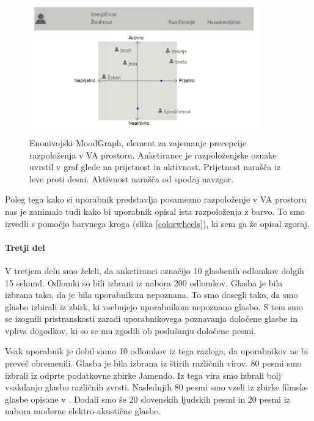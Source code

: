 \documentclass[a4paper, 12pt]{book}
\begin{document}
{\begin{figure}[ht]
\centering
\includegraphics[width=10cm]{images/enomoodgraph.png}

\caption{Enonivojski MoodGraph, element za zajemanje precepcije razpoloženja v VA prostoru. Anketiranec je razpoloženjske oznake uvrstil v graf glede na prijetnost in aktivnost. Prijetnost narašča iz leve proti desni. Aktivnost narašča od spodaj navzgor. }
\label{moodgraph}
\end{figure}

Poleg tega kako si uporabnik predstavlja posamezno razpoloženje v VA prostoru nas je zanimalo tudi kako bi uporabnik opisal ista razpoloženja z barvo. To smo izvedli s pomočjo barvnega kroga (slika \ref{colorwheels}), ki sem ga že opisal zgoraj. 

\paragraph{Tretji del}

V tretjem delu smo želeli, da anketiranci označijo 10 glasbenih odlomkov dolgih 15 sekund. Odlomki so bili izbrani iz nabora 200 odlomkov. Glasba je bila izbrana tako, da je bila uporabnikom nepoznana. To smo dosegli tako, da smo glasbo izbirali iz zbirk, ki vsebujejo uporabnikom nepoznano glasbo. S tem smo se izognili pristranskosti zaradi uporabnikovega poznavanja določene glasbe in vpliva dogodkov, ki so se mu zgodili ob poslušanju določene pesmi. 

Vsak uporabnik je dobil samo 10 odlomkov iz tega razloga, da uporabnikov ne bi preveč obremenili. Glasba je bila izbrana iz štirih različnih virov. 80 pesmi smo izbrali iz odprte podatkovne zbirke Jamendo. Iz tega vira smo izbrali bolj vsakdanjo glasbo različnih zvrsti. Naslednjih 80 pesmi smo vzeli iz zbirke filmske glasbe opisane v \cite{Eerola2010}. Dodali smo še 20 slovenskih ljudskih pesmi in 20 pesmi iz nabora moderne elektro-akustične glasbe. 

}
\end{document}
